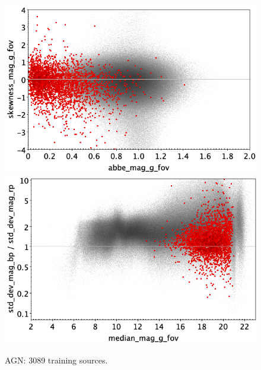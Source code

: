 \documentclass[longauth]{aa}
\begin{document}
\begin{appendix}
\begin{figure}
\vspace{4mm}
 \includegraphics[width=0.45\hsize]{figures/appendix/AGN_trn_ask.png}  %
\hspace{2mm}
 \includegraphics[width=0.45\hsize]{figures/appendix/AGN_trn_msdr.png}  \\ %
\vspace{4mm}
 \caption{AGN: 3089 training sources.}  
 \label{fig:app:AGN_trn}
\end{figure}


\end{appendix}
\end{document}

